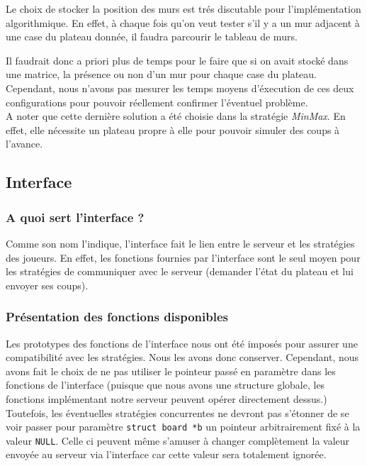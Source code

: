 \documentclass[12pt,a4paper]{article}
\begin{document}
Le choix de stocker la position des murs est trés discutable pour 
l'implémentation algorithmique. En effet, à chaque fois qu'on veut tester s'il y 
a un mur adjacent à une case du plateau donnée, il faudra parcourir le 
tableau de murs.

Il faudrait donc a priori plus de temps pour le faire que si on avait stocké dans une 
matrice, la présence ou non d'un mur pour chaque case du plateau. Cependant, nous 
n'avons pas mesurer les temps moyens d'éxecution de ces deux configurations pour pouvoir 
réellement confirmer l'éventuel problème.\\

A noter que cette dernière solution a été choisie dans la stratégie \textit{MinMax}.
En effet, elle nécessite un plateau propre à elle pour pouvoir simuler des coups à 
l'avance.

\subsection{Interface}

\subsubsection{A quoi sert l'interface ?}

Comme son nom l'indique, l'interface fait le lien entre le serveur et les stratégies 
des joueurs. En effet, les fonctions fournies par l'interface sont le seul moyen pour
les stratégies de \og communiquer \fg{} avec le serveur (demander l'état du plateau 
et lui envoyer ses coups).

\subsubsection{Présentation des fonctions disponibles}

Les prototypes des fonctions de l'interface nous ont été imposés pour assurer une 
compatibilité avec les stratégies. Nous les avons donc conserver. Cependant, nous 
avons fait le choix de ne pas utiliser le pointeur passé en paramètre dans 
les fonctions de l'interface (puisque que nous avons une structure globale, les 
fonctions implémentant notre serveur peuvent opérer directement dessus.)\\

Toutefois, les éventuelles stratégies concurrentes ne devront  pas s'étonner de 
se voir passer pour paramètre \verb:struct board *b: un pointeur  arbitrairement 
fixé à la valeur \verb,NULL,. Celle ci peuvent même s'amuser à changer complètement la 
valeur envoyée au serveur via l'interface car cette valeur sera totalement 
ignorée.\\
\end{document}
